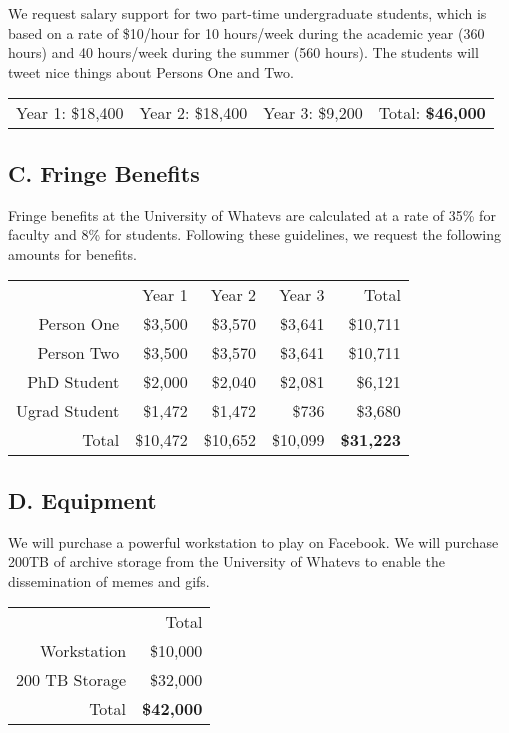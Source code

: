 \documentclass[nsfbudgjust]{nsfproposal}
\begin{document}
 We request salary support for two part-time undergraduate students, which is based on a rate of \$10/hour for 10 hours/week during the academic year (360 hours) and 40 hours/week during the summer (560 hours). The students will tweet nice things about Persons One and Two.
\newline
\begin{table}[H]
\begin{tabular}[c]{cccc}
Year 1: \$18,400 & Year 2: \$18,400 & Year 3: \$9,200 & Total: \textbf{\$46,000}
\end{tabular}
\end{table}

\subsection*{C. Fringe Benefits}
Fringe benefits at the University of Whatevs are calculated at a rate of 35\% for faculty and 8\% for students. Following these guidelines, we request the following amounts for benefits.
\newline
\begin{table}[H]
\begin{tabular}[c]{r r r r | r}
                & Year 1     & Year 2     & Year 3     & Total\\
 Person One     & \$3,500    & \$3,570    & \$3,641    & \$10,711\\
 Person Two     & \$3,500    & \$3,570    & \$3,641    & \$10,711\\
 PhD Student    & \$2,000    & \$2,040    & \$2,081    & \$6,121\\
 Ugrad Student  & \$1,472    & \$1,472    & \$736      & \$3,680\\
 \hline
 Total          & \$10,472   & \$10,652   & \$10,099   & \textbf{\$31,223} \\
\end{tabular}
\end{table}

\subsection*{D. Equipment}
We will purchase a powerful workstation to play on Facebook. We will purchase 200TB of archive storage from the University of Whatevs to enable the dissemination of memes and gifs.
\newline
\begin{table}[H]
\begin{tabular}[c]{r | r}
 & Total\\
Workstation     & \$10,000\\
200 TB Storage  & \$32,000\\
\hline
Total           & \textbf{\$42,000}
\end{tabular}
\end{table}
\end{document}
